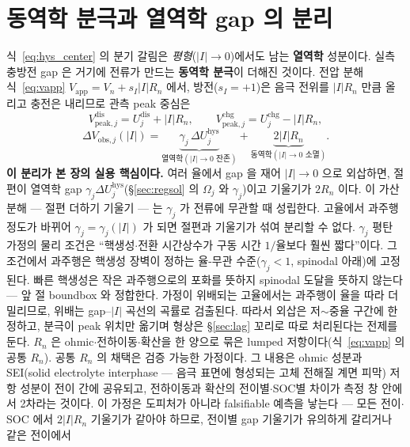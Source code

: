 \documentclass[11pt,a4paper]{article}
\newcommand{\app}{\mathrm{app}}
\newcommand{\dis}{\mathrm{dis}}
\newcommand{\chg}{\mathrm{chg}}
\newcommand{\hys}{\mathrm{hys}}
\begin{document}
\section{동역학 분극과 열역학 gap 의 분리}\label{sec:hys_pol}
식~\eqref{eq:hys_center} 의 분기 갈림은 \emph{평형}($|I|\to0$)에서도 남는 \textbf{열역학} 성분이다. 실측 충방전 gap 은
거기에 전류가 만드는 \textbf{동역학 분극}이 더해진 것이다. 전압 분해 식~\eqref{eq:vapp}
$V_\app=V_n+s_I|I|R_n$ 에서, 방전($s_I=+1$)은 음극 전위를 $|I|R_n$ 만큼 올리고 충전은 내리므로 관측 peak 중심은
\begin{equation}
V_{\mathrm{peak},j}^{\dis}=U_j^\dis+|I|R_n,\qquad V_{\mathrm{peak},j}^{\chg}=U_j^\chg-|I|R_n,
\label{eq:hys_obspeak}
\end{equation}
\begin{equation}
\boxed{\;\Delta V_{\mathrm{obs},j}(|I|)=\underbrace{\gamma_j\,\Delta U_j^\hys}_{\text{열역학}(|I|\to0\text{ 잔존})}
+\underbrace{2|I|R_n}_{\text{동역학}(|I|\to0\text{ 소멸})}.\;}
\label{eq:hys_obsgap}
\end{equation}
\textbf{이 분리가 본 장의 실용 핵심이다.} 여러 율에서 gap 을 재어 $|I|\to0$ 으로 외삽하면, 절편이 열역학 gap
$\gamma_j\Delta U_j^\hys$(\S\ref{sec:regsol} 의 $\Omega_j$ 와 $\gamma_j$)이고 기울기가 $2R_n$ 이다. 이 가산
분해 — 절편 더하기 기울기 — 는 $\gamma_j$ 가 전류에 무관할 때 성립한다. 고율에서 과주행 정도가 바뀌어
$\gamma_j=\gamma_j(|I|)$ 가 되면 절편과 기울기가 섞여 분리할 수 없다. $\gamma_j$ 평탄 가정의 물리 조건은
``핵생성$\cdot$전환 시간상수가 구동 시간 $1/$율보다 훨씬 짧다''이다. 그 조건에서 과주행은 핵생성 장벽이 정하는
율-무관 수준($\gamma_j<1$, spinodal 아래)에 고정된다. 빠른 핵생성은 작은 과주행으로의 포화를 뜻하지 spinodal
도달을 뜻하지 않는다 — 앞 절 boundbox 와 정합한다. 가정이 위배되는 고율에서는 과주행이 율을 따라 더 밀리므로,
위배는 gap--$|I|$ 곡선의 곡률로 검출된다. 따라서 외삽은 저$\sim$중율 구간에 한정하고, 분극이 peak 위치만 옮기며
형상은 \S\ref{sec:lag} 꼬리로 따로 처리된다는 전제를 둔다.
$R_n$ 은 ohmic$\cdot$전하이동$\cdot$확산을 한 양으로 묶은 lumped 저항이다(식~\eqref{eq:vapp} 의 공통 $R_n$).
공통 $R_n$ 의 채택은 검증 가능한 가정이다. 그 내용은 ohmic 성분과 SEI(solid electrolyte interphase — 음극 표면에 형성되는 고체 전해질 계면 피막) 저항
성분이 전이 간에 공유되고, 전하이동과 확산의
전이별$\cdot$SOC별 차이가 측정 창 안에서 2차라는 것이다. 이 가정은 도피처가 아니라 falsifiable 예측을 낳는다 —
모든 전이$\cdot$SOC 에서 $2|I|R_n$ 기울기가 같아야 하므로, 전이별 gap 기울기가 유의하게 갈리거나 같은 전이에서
\end{document}
